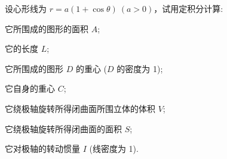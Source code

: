 \begin{example}
    设心形线为 $r=a(1+\cos\theta)~ (a>0)$，试用定积分计算: \newline
    \begin{enumerate*}[label=(\arabic{*})]
        \item 它所围成的图形的面积 $A$;
        \item 它的长度 $L$;
        \item 它所围成的图形 $D$ 的重心 ($D$ 的密度为 1);
        \item 它自身的重心 $C$;
        \item 它绕极轴旋转所得闭曲面所围立体的体积 $V$;
        \item 它绕极轴旋转所得闭曲面的面积 $S$;
        \item 它对极轴的转动惯量 $I$ (线密度为 1).
    \end{enumerate*}
\end{example}
